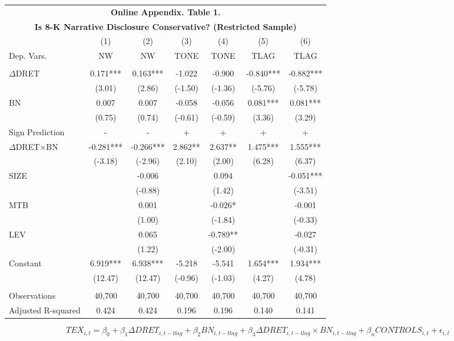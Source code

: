 \begin{table}[H]	\label{oat1}%
	\begin{center}
		\begin{tabular}{lcccccc}
			\multicolumn{7}{c}{\textbf{Online Appendix. Table 1.}} \\
			\multicolumn{7}{c}{\textbf{Is 8-K Narrative Disclosure Conservative? (Restricted Sample)}} \\
			\midrule
			\midrule
			& (1) & (2) & (3) & (4) & (5) & (6) \\
			Dep. Vars. & NW & NW & TONE & TONE & TLAG & TLAG \\
			\midrule
			&   &   &   &   &   &  \\
			$\Delta$DRET & 0.171*** & 0.163*** & -1.022 & -0.900 & -0.840*** & -0.882*** \\
			& (3.01) & (2.86) & (-1.50) & (-1.36) & (-5.76) & (-5.78) \\
			BN & 0.007 & 0.007 & -0.058 & -0.056 & 0.081*** & 0.081*** \\
			& (0.75) & (0.74) & (-0.61) & (-0.59) & (3.36) & (3.29) \\
			\rowcolor[rgb]{ .933,  .925,  .882} Sign Prediction & - & - & + & + & + & + \\
			\rowcolor[rgb]{ .933,  .925,  .882} $\Delta$DRET$\times$BN & -0.281*** & -0.266*** & 2.862** & 2.637** & 1.475*** & 1.555*** \\
			\rowcolor[rgb]{ .933,  .925,  .882}   & (-3.18) & (-2.96) & (2.10) & (2.00) & (6.28) & (6.37) \\
			SIZE &   & -0.006 &   & 0.094 &   & -0.051*** \\
			&   & (-0.88) &   & (1.42) &   & (-3.51) \\
			MTB &   & 0.001 &   & -0.026* &   & -0.001 \\
			&   & (1.00) &   & (-1.84) &   & (-0.33) \\
			LEV &   & 0.065 &   & -0.789** &   & -0.027 \\
			&   & (1.22) &   & (-2.00) &   & (-0.31) \\
			Constant & 6.919*** & 6.938*** & -5.218 & -5.541 & 1.654*** & 1.934*** \\
			& (12.47) & (12.47) & (-0.96) & (-1.03) & (4.27) & (4.78) \\
			&   &   &   &   &   &  \\
			Observations & 40,700 & 40,700 & 40,700 & 40,700 & 40,700 & 40,700 \\
			Adjusted R-squared & 0.424 & 0.424 & 0.196 & 0.196 & 0.140 & 0.141 \\
			\bottomrule
			\bottomrule
		\end{tabular}%
	\end{center}
		\begin{footnotesize}
			\setcounter{equation}{1}
			\begin{equation}
				TEX_{i,t}=\beta_0+\beta_1\Delta DRET_{i,t-tlag}+\beta_2BN_{i,t-tlag}+\beta_3\Delta DRET_{i,t-tlag}\times 	BN_{i,t-tlag}+\beta_nCONTROLS_{i,t}+\epsilon_{i,t}
			\end{equation}
			

\end{footnotesize}
\end{table}
